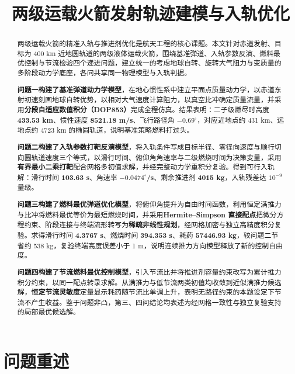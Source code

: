 \documentclass[withoutpreface,bwprint]{cumcmthesis}
\title{两级运载火箭发射轨迹建模与入轨优化}
\begin{document}
\maketitle

\begin{abstract}
两级运载火箭的精准入轨与推进剂优化是航天工程的核心课题。本文针对赤道发射、目标为 400 km 近地圆轨道的两级液体运载火箭，围绕基准弹道、入轨参数反演、燃料最优控制与节流检验四个递进问题，建立统一的考虑地球自转、旋转大气阻力与变质量的多阶段动力学底座，各问共享同一物理模型与入轨判据。

\textbf{问题一构建了基准弹道动力学模型}，在地心惯性系中建立平面点质量动力学，以赤道东射初速刻画地球自转优势，以相对大气速度计算阻力，以真空比冲确定质量流量，并采用\textbf{分段自适应数值积分（DOP853）}完成全程仿真。结果表明：二子级燃尽时高度 \textbf{433.53 km}、惯性速度 \textbf{8521.18 m/s}、飞行路径角 $-0.69^\circ$，对应近地点约 431 km、远地点约 4723 km 的椭圆轨道，说明基准策略燃料打过头。

\textbf{问题二构建了入轨参数打靶反演模型}，将入轨条件写成目标半径、零径向速度与顺行切向圆轨道速度三个等式，以滑行时间、俯仰角角速率与二级燃烧时间为决策变量，采用\textbf{有界最小二乘打靶}配合网格多初值求解，并经完整动力学重积分复验。得到可行入轨解：滑行时间 \textbf{103.63 s}、角速率 \textbf{$-0.0474^\circ$/s}、剩余推进剂 \textbf{4015 kg}，入轨残差达 $10^{-9}$ 量级。

\textbf{问题三构建了燃料最优弹道优化模型}，将俯仰角提升为自由时间函数，利用恒定满推力与比冲将燃料最优等价为最短燃烧时间，并采用\textbf{Hermite--Simpson 直接配点}把微分方程约束、阶段连接与终端流形转写为\textbf{稀疏非线性规划}，经网格加密与独立高精度积分复验。求得滑行时间 \textbf{4.3767 s}、燃烧时间 \textbf{394.353 s}、耗药 \textbf{57446.93 kg}，较问题二节省约 538 kg，复验终端高度误差小于 1 m，说明连续推力方向模型释放了新的控制自由度。

\textbf{问题四构建了节流燃料最优控制模型}，引入节流比并将推进剂容量约束改写为累计推力积分约束，以同一配点转录求解。从满推力与低节流两类初值均收敛到近似满推力候选解，\textbf{恒定节流灵敏度}定量显示耗药随节流比单调上升，表明无路径约束的本题设定下节流不产生收益。鉴于问题非凸，第三、四问结论均表述为经网格一致性与独立复验支持的局部最优候选解。

\end{abstract}


\section{问题重述}
\end{document}
